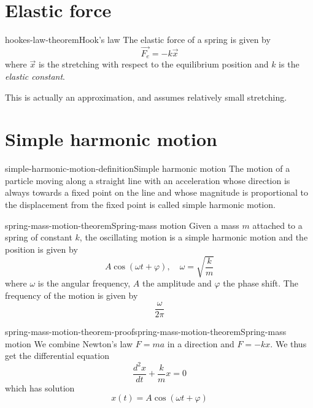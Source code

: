 \documentclass[preview]{standalone}
\begin{document}
\genpage

\section{Elastic force}

\begin{snippettheorem}{hookes-law-theorem}{Hook's law}
    The elastic force of a spring is given by
    \[
        \vec{F_e} = -k \vec{x}
    \]
    where \(\vec{x}\) is the stretching with respect to the equilibrium position
    and \(k\) is the \emph{elastic constant}.
\end{snippettheorem}

\begin{plainhtml}
    This is actually an approximation, and assumes relatively small stretching.
\end{plainhtml}

\section{Simple harmonic motion}

\begin{snippetdefinition}{simple-harmonic-motion-definition}{Simple harmonic motion}
    The motion of a particle moving along a straight line with an acceleration whose direction is always towards a fixed point on the line and whose magnitude is proportional to the displacement from the fixed point is called simple harmonic motion.
\end{snippetdefinition}

\begin{snippettheorem}{spring-mass-motion-theorem}{Spring-mass motion}
    Given a mass \(m\) attached to a spring of constant \(k\),
    the oscillating motion is a simple harmonic motion and the position is given by
    \[
        A\cos(\omega t + \varphi), \quad \omega = \sqrt{\frac{k}{m}}
    \]
    where \(\omega\) is the angular frequency, \(A\) the amplitude
    and \(\varphi\) the phase shift. The frequency of the motion is given by
    \[
        \frac{\omega}{2\pi}
    \]
\end{snippettheorem}

\begin{snippetproof}{spring-mass-motion-theorem-proof}{spring-mass-motion-theorem}{Spring-mass motion}
    We combine Newton's law \(F = ma\) in a direction and \(F = -kx\).
    We thus get the differential equation
    \[
        \frac{d^2 x}{dt} + \frac{k}{m}x = 0 
    \]
    which has solution
    \[
        x(t) = A \cos(\omega t + \varphi)
    \]
\end{snippetproof}
\end{document}
